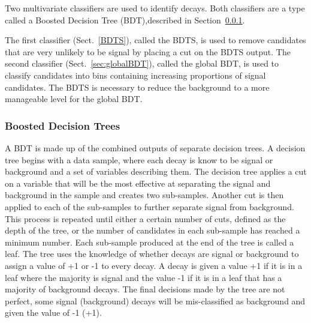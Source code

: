 Two multivariate classifiers are used to identify \bsmumu decays. Both classifiers are a type called a Boosted Decision Tree (BDT),described in Section~\ref{sec:GeneralBDT}. %

The first classifier (Sect.~\ref{BDTS}), called the BDTS, is used to remove candidates that are very unlikely to be signal by placing a cut on the BDTS output. %
The second classifier (Sect.~\ref{sec:globalBDT}), called the global BDT, is used to classify candidates into bins containing increasing proportions of signal candidates. %
The BDTS is necessary to reduce the background to a more manageable level for the global BDT.

\subsubsection{Boosted Decision Trees}
\label{sec:GeneralBDT}
A BDT is made up of the combined outputs of separate decision trees. A decision tree begins with a data sample, where each decay is know to be signal or background and a set of variables describing them. The decision tree applies a cut on a variable that will be the most effective at separating the signal and background in the sample and creates two sub-samples. Another cut is then applied to each of the sub-samples to further separate signal from background. This process is repeated until either a certain number of cuts, defined as the depth of the tree, or the number of candidates in each sub-sample has reached a minimum number. Each sub-sample produced at the end of the tree is called a leaf. The tree uses the knowledge of whether decays are signal or background to assign a value of +1 or -1 to every decay. A decay is given a value +1 if it is in a leaf where the majority is signal and the value -1 if it is in a leaf that has a majority of background decays. The final decisions made by the tree are not perfect, some signal (background) decays will be mis-classified as background and given the value of -1 (+1). %

